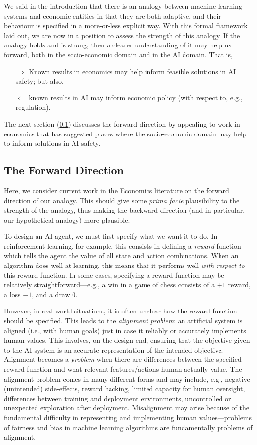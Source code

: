 \documentclass{amsart}
\theoremstyle{indented}
\theoremstyle{indentedProp}
\theoremstyle{indented}
\theoremstyle{indented}
\theoremstyle{indented}
\theoremstyle{indented}
\theoremstyle{indented}
\begin{document}
We said in the introduction that there is an analogy between machine-learning systems and economic entities in that they are both adaptive, and their behaviour is specified in a more-or-less explicit way. With this formal framework laid out, we are now in a position to assess the strength of this analogy. If the analogy holds and is strong, then a clearer understanding of it may help us forward, both in the socio-economic domain and in the AI domain. That is, 
\begin{enumerate}
    \item[$\Rightarrow$] Known results in economics may help inform feasible solutions in AI safety; but also,
    \item[$\Leftarrow$] known results in AI may inform economic policy (with respect to, e.g., regulation).
\end{enumerate}
The next section (\ref{sec:ForwardDirection}) discusses the forward direction by appealing to work in economics that has suggested places where the socio-economic domain may help to inform solutions in AI safety. 

\subsection{The Forward Direction}
\label{sec:ForwardDirection}

Here, we consider current work in the Economics literature on the forward direction of our analogy. This should give some {\it prima facie} plausibility to the strength of the analogy, thus making the backward direction (and in particular, our hypothetical analogy) more plausible. 

To design an AI agent, we must first specify what we want it to do. In reinforcement learning, for example, this consists in defining a {\it reward} function which tells the agent the value of all state and action combinations. When an algorithm does well at learning, this means that it performs well {\it with respect to} this reward function. In some cases, specifying a reward function may be relatively straightforward---e.g., a win in a game of chess consists of a $+1$ reward, a loss $-1$, and a draw $0$. 

However, in real-world situations, it is often unclear how the reward function should be specified. This leads to the {\it alignment problem}: an artificial system is aligned (i.e., with human goals) just in case it reliably or accurately implements human values. This involves, on the design end, ensuring that the objective given to the AI system is an accurate representation of the intended objective. Alignment becomes a {\it problem} when there are differences between the specified reward function and what relevant features/actions human actually value. The alignment problem comes in many different forms and may include, e.g., negative (unintended) side-effects, reward hacking, limited capacity for human oversight, differences between training and deployment environments, uncontrolled or unexpected exploration after deployment. Misalignment may arise because of the fundamental difficulty in representing and implementing human values---problems of fairness and bias in machine learning algorithms are fundamentally problems of alignment. 
\end{document}
